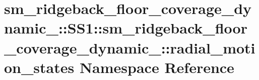 \hypertarget{namespacesm__ridgeback__floor__coverage__dynamic__1_1_1SS1_1_1sm__ridgeback__floor__coverage__dy8a0be66cafdbe893e97ae1235d652522}{}\section{sm\+\_\+ridgeback\+\_\+floor\+\_\+coverage\+\_\+dynamic\+\_\+:\+:S\+S1\+:\+:sm\+\_\+ridgeback\+\_\+floor\+\_\+coverage\+\_\+dynamic\+\_\+:\+:radial\+\_\+motion\+\_\+states Namespace Reference}
\label{namespacesm__ridgeback__floor__coverage__dynamic__1_1_1SS1_1_1sm__ridgeback__floor__coverage__dy8a0be66cafdbe893e97ae1235d652522}

